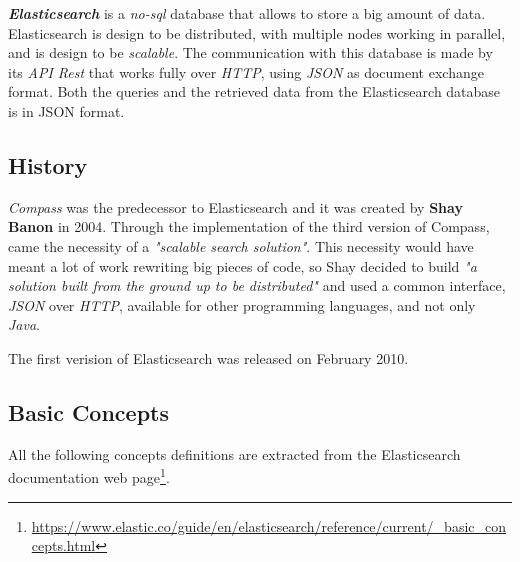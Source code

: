 \documentclass[a4paper, 12pt, english]{book}
\begin{document}
\textit{\textbf{Elasticsearch}} is a \textit{no-sql} database that allows to store a big amount of data. Elasticsearch is design to be distributed, with multiple nodes working in parallel, and is design to be \textit{scalable}. The communication with this database is made by its \textit{API Rest} that works fully over \textit{HTTP}, using \textit{JSON} as document exchange format. Both the queries and the retrieved data from the Elasticsearch database is in JSON format.

\subsection{History}
\label{subsec:elasticsearch-history}
\textit{Compass} was the predecessor to Elasticsearch and it was created by \textbf{Shay Banon} in 2004. Through the implementation of the third version of Compass, came the necessity of a \textit{"scalable search solution"}. This necessity would have meant a lot of work rewriting big pieces of code, so Shay decided to build \textit{"a solution built from the ground up to be distributed"} and used a common interface, \textit{JSON} over \textit{HTTP}, available for other programming languages, and not only \textit{Java}.

The first verision of Elasticsearch was released on February 2010.

\subsection{Basic Concepts}
\label{subsec:elasticsearch-basic-concepts}

All the following concepts definitions are extracted from the Elasticsearch documentation web page\footnote{\url{https://www.elastic.co/guide/en/elasticsearch/reference/current/_basic_concepts.html}}.
\end{document}
